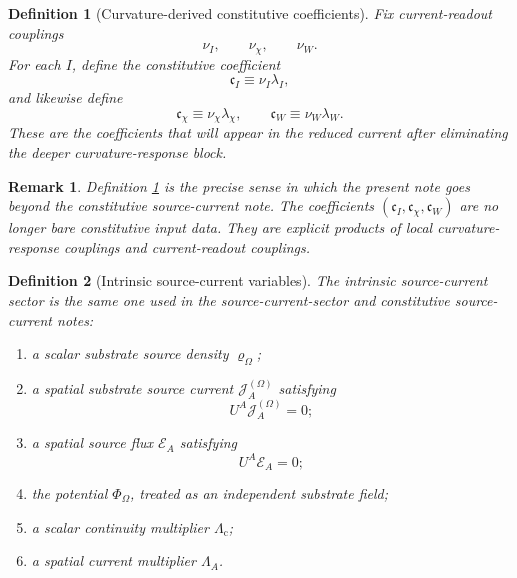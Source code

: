 \documentclass[11pt]{article}
\newcommand{\FlowPot}{\Phi_\Omega}
\newcommand{\SourceDensity}{\varrho_\Omega}
\newcommand{\SourceCurrent}{\mathcal J^{(\Omega)}}
\newcommand{\ContMult}{\Lambda_{\mathrm c}}
\newcommand{\CurrentMult}{\Lambda}
\newcommand{\SourceFlux}{\mathcal E}
\newtheorem{definition}{Definition}
\newtheorem{remark}{Remark}
\begin{document}
\begin{definition}[Curvature-derived constitutive coefficients]
\label{def:cfromlambda}
Fix current-readout couplings
\begin{equation}
\nu_I,
\qquad
\nu_\chi,
\qquad
\nu_W.
\label{eq:nus}
\end{equation}
For each \(I\), define the constitutive coefficient
\begin{equation}
\mathfrak c_I\equiv \nu_I\lambda_I,
\label{eq:cIdef}
\end{equation}
and likewise define
\begin{equation}
\mathfrak c_\chi\equiv \nu_\chi\lambda_\chi,
\qquad
\mathfrak c_W\equiv \nu_W\lambda_W.
\label{eq:crestdef}
\end{equation}
These are the coefficients that will appear in the reduced current after eliminating the deeper curvature-response block.
\end{definition}

\begin{remark}
Definition \ref{def:cfromlambda} is the precise sense in which the present note goes beyond the constitutive source-current note. The coefficients \((\mathfrak c_I,\mathfrak c_\chi,\mathfrak c_W)\) are no longer bare constitutive input data. They are explicit products of local curvature-response couplings and current-readout couplings.
\end{remark}

\begin{definition}[Intrinsic source-current variables]
\label{def:sourcevars}
The \emph{intrinsic source-current sector} is the same one used in the source-current-sector and constitutive source-current notes:
\begin{enumerate}
    \item a scalar substrate source density \(\SourceDensity\);
    \item a spatial substrate source current \(\SourceCurrent_A\) satisfying
    \begin{equation}
    U^A\SourceCurrent_A=0;
    \label{eq:spatialcurrent}
    \end{equation}
    \item a spatial source flux \(\SourceFlux_A\) satisfying
    \begin{equation}
    U^A\SourceFlux_A=0;
    \label{eq:spatialflux}
    \end{equation}
    \item the potential \(\FlowPot\), treated as an independent substrate field;
    \item a scalar continuity multiplier \(\ContMult\);
    \item a spatial current multiplier \(\CurrentMult_A\).
\end{enumerate}
\end{definition}
\end{document}
